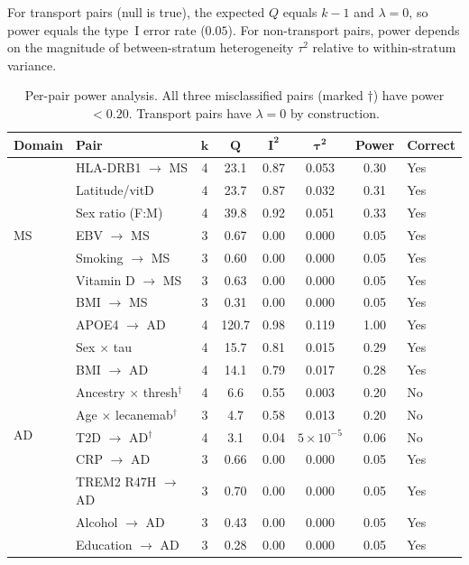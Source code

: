 \documentclass[11pt]{article}
\begin{document}
For transport pairs (null is true), the expected $Q$ equals $k - 1$ and $\lambda = 0$, so power equals the type~I error rate ($0.05$). For non-transport pairs, power depends on the magnitude of between-stratum heterogeneity $\tau^2$ relative to within-stratum variance.

\begin{table}[h]
\centering
\caption{Per-pair power analysis. All three misclassified pairs (marked $\dagger$) have power $< 0.20$. Transport pairs have $\lambda = 0$ by construction.}
\label{tab:power-full}
\small
\begin{tabular}{@{}llcccccl@{}}
\toprule
\textbf{Domain} & \textbf{Pair} & $\boldsymbol{k}$ & $\boldsymbol{Q}$ & $\boldsymbol{I^2}$ & $\boldsymbol{\tau^2}$ & \textbf{Power} & \textbf{Correct} \\
\midrule
\multirow{7}{*}{MS}
& HLA-DRB1 $\to$ MS & 4 & 23.1 & 0.87 & 0.053 & 0.30 & Yes \\
& Latitude/vitD & 4 & 23.7 & 0.87 & 0.032 & 0.31 & Yes \\
& Sex ratio (F:M) & 4 & 39.8 & 0.92 & 0.051 & 0.33 & Yes \\
& EBV $\to$ MS & 3 & 0.67 & 0.00 & 0.000 & 0.05 & Yes \\
& Smoking $\to$ MS & 3 & 0.60 & 0.00 & 0.000 & 0.05 & Yes \\
& Vitamin D $\to$ MS & 3 & 0.63 & 0.00 & 0.000 & 0.05 & Yes \\
& BMI $\to$ MS & 3 & 0.31 & 0.00 & 0.000 & 0.05 & Yes \\
\midrule
\multirow{10}{*}{AD}
& APOE4 $\to$ AD & 4 & 120.7 & 0.98 & 0.119 & 1.00 & Yes \\
& Sex $\times$ tau & 4 & 15.7 & 0.81 & 0.015 & 0.29 & Yes \\
& BMI $\to$ AD & 4 & 14.1 & 0.79 & 0.017 & 0.28 & Yes \\
& Ancestry $\times$ thresh$^\dagger$ & 4 & 6.6 & 0.55 & 0.003 & 0.20 & No \\
& Age $\times$ lecanemab$^\dagger$ & 3 & 4.7 & 0.58 & 0.013 & 0.20 & No \\
& T2D $\to$ AD$^\dagger$ & 4 & 3.1 & 0.04 & $5 \times 10^{-5}$ & 0.06 & No \\
& CRP $\to$ AD & 3 & 0.66 & 0.00 & 0.000 & 0.05 & Yes \\
& TREM2 R47H $\to$ AD & 3 & 0.70 & 0.00 & 0.000 & 0.05 & Yes \\
& Alcohol $\to$ AD & 3 & 0.43 & 0.00 & 0.000 & 0.05 & Yes \\
& Education $\to$ AD & 3 & 0.28 & 0.00 & 0.000 & 0.05 & Yes \\
\bottomrule
\end{tabular}
\end{table}
\end{document}

